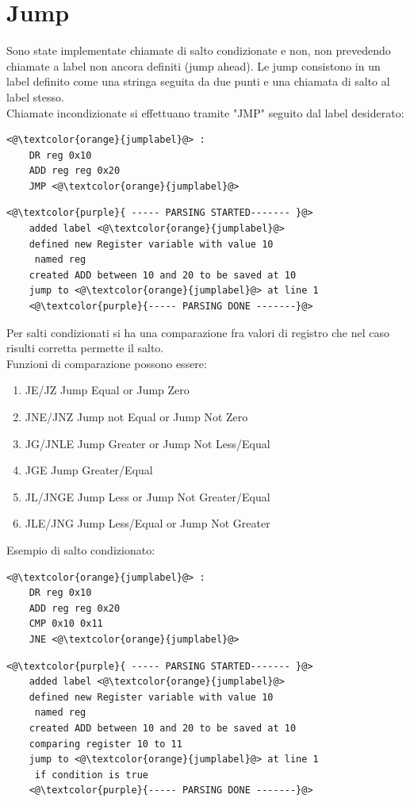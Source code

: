 \section{Jump}
Sono state implementate chiamate di salto condizionate e non, non prevedendo chiamate a label non ancora definiti (jump ahead).
Le jump consistono in un label definito come una stringa seguita da due punti e una chiamata di salto al label stesso.
\\Chiamate incondizionate si effettuano tramite "JMP" seguito dal label desiderato:
\begin{lstlisting}[caption=input]
    <@\textcolor{orange}{jumplabel}@> :
    DR reg 0x10
    ADD reg reg 0x20
    JMP <@\textcolor{orange}{jumplabel}@>
\end{lstlisting}

\begin{lstlisting}[caption=output]
    <@\textcolor{purple}{ ----- PARSING STARTED------- }@>
    added label <@\textcolor{orange}{jumplabel}@>
    defined new Register variable with value 10 
     named reg
    created ADD between 10 and 20 to be saved at 10
    jump to <@\textcolor{orange}{jumplabel}@> at line 1
    <@\textcolor{purple}{----- PARSING DONE -------}@>
\end{lstlisting}
Per salti condizionati si ha una comparazione fra valori di registro che nel caso risulti corretta permette il salto.
\\Funzioni di comparazione possono essere:
\begin{enumerate}
    \item JE/JZ     Jump Equal or Jump Zero
    \item JNE/JNZ 	Jump not Equal or Jump Not Zero
    \item JG/JNLE 	Jump Greater or Jump Not Less/Equal 
    \item JGE 	    Jump Greater/Equal
    \item JL/JNGE 	Jump Less or Jump Not Greater/Equal
    \item JLE/JNG 	Jump Less/Equal or Jump Not Greater
\end{enumerate}
Esempio di salto condizionato:
\begin{lstlisting}[caption=input]
    <@\textcolor{orange}{jumplabel}@> :
    DR reg 0x10
    ADD reg reg 0x20
    CMP 0x10 0x11
    JNE <@\textcolor{orange}{jumplabel}@>
\end{lstlisting}
\begin{lstlisting}[caption=output]
    <@\textcolor{purple}{ ----- PARSING STARTED------- }@>
    added label <@\textcolor{orange}{jumplabel}@>
    defined new Register variable with value 10 
     named reg
    created ADD between 10 and 20 to be saved at 10
    comparing register 10 to 11
    jump to <@\textcolor{orange}{jumplabel}@> at line 1
     if condition is true
    <@\textcolor{purple}{----- PARSING DONE -------}@>
\end{lstlisting}




